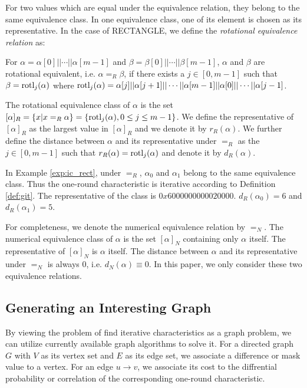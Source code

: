 For two values which are equal under the equivalence relation, they belong to the same equivalence class. In one equivalence class, one of its element is chosen as its representative. In the case of RECTANGLE, we define the \textit{rotational equivalence relation} as:

\begin{definition}[Rotational Equivalence Relation $=_R$]
	For $\alpha=\alpha[0]||\cdots||\alpha[m-1]$ and $\beta=\beta[0]||\cdots||\beta[m-1]$, $\alpha$ and $\beta$ are rotational equivalent, i.e. $\alpha=_R\beta$, if there exists a $j\in[0,m-1]$ such that $\beta=\text{rotl}_j(\alpha)$ where $\text{rotl}_j(\alpha)=\alpha[j]||\alpha[j+1]||\cdots||\alpha[m-1]||\alpha[0]||\cdots||\alpha[j-1]$. 
\end{definition}
The rotational equivalence class of $\alpha$ is the set $[\alpha]_R=\{x|x=_R\alpha\}=\{\text{rotl}_j(\alpha),0\leq j\leq m-1\}$. We define the representative of $[\alpha]_R$ as the largest value in $[\alpha]_R$ and we denote it by $r_R(\alpha)$. We further define the distance between $\alpha$ and its representative under $=_R$ as the $j\in[0,m-1]$ such that $r_R(\alpha)=\text{rotl}_j(\alpha)$ and denote it by $d_R(\alpha)$. 

In Example \ref{exp:ic_rect}, under $=_R$, $\alpha_0$ and $\alpha_1$ belong to the same equivalence class. Thus the one-round characteristic is iterative according to Definition \ref{def:git}. The representative of the class is $0x 6000 0000 0002 0000$. $d_R(\alpha_0)=6$ and $d_R(\alpha_1)=5$.

For completeness, we denote the numerical equivalence relation by $=_{N}$. The numerical equivalence class of $\alpha$ is the set $[\alpha]_N$ containing only $\alpha$ itself. The representative of $[\alpha]_N$ is $\alpha$ itself. The distance between $\alpha$ and its representative under $=_N$ is always 0, i.e. $d_N(\alpha)\equiv 0$. In this paper, we only consider these two equivalence relations. 

\subsection{Generating an Interesting Graph}\label{sec:gen_G}

By viewing the problem of find iterative characteristics as a graph problem, we can utilize currently available graph algorithms to solve it. For a directed graph $G$ with $V$ as its vertex set and $E$ as its edge set, we associate a difference or mask value to a vertex. For an edge $u\rightarrow v$, we associate its cost to the diffrential probability or correlation of the corresponding one-round characteristic.

